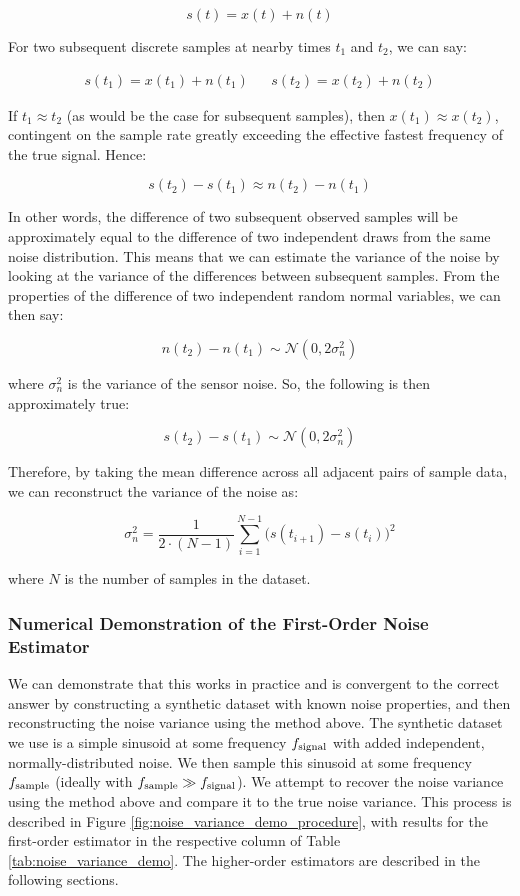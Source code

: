 \documentclass[conf]{new-aiaa}
\begin{document}
    $$s(t) = x(t) + n(t)$$

    \noindent For two subsequent discrete samples at nearby times $t_1$ and $t_2$, we can say:

    \begin{align*}
        s(t_1) = x(t_1) + n(t_1) &&
        s(t_2) = x(t_2) + n(t_2)
    \end{align*}

    \noindent If $t_1 \approx t_2$ (as would be the case for subsequent samples), then $x(t_1) \approx x(t_2)$, contingent on the sample rate greatly exceeding the effective fastest frequency of the true signal. Hence:

    $$s(t_2) - s(t_1) \approx n(t_2) - n(t_1)$$

    In other words, the difference of two subsequent observed samples will be approximately equal to the difference of two independent draws from the same noise distribution. This means that we can estimate the variance of the noise by looking at the variance of the differences between subsequent samples. From the properties of the difference of two independent random normal variables, we can then say:

    $$n(t_2) - n(t_1) \sim \mathcal{N}(0, 2\sigma^2_n)$$

    \noindent where $\sigma^2_n$ is the variance of the sensor noise. So, the following is then approximately true:

    $$s(t_2) - s(t_1) \sim \mathcal{N}(0, 2\sigma^2_n)$$

    Therefore, by taking the mean difference across all adjacent pairs of sample data, we can reconstruct the variance of the noise as:

    \begin{equation}
        \sigma^2_n = \frac{1}{2 \cdot (N-1)} \sum_{i=1}^{N-1} \Big( s(t_{i+1}) - s(t_i) \Big)^2
        \label{eq:1st_order_noise_estimator}
    \end{equation}

    \noindent where $N$ is the number of samples in the dataset.

    \subsubsection{Numerical Demonstration of the First-Order Noise Estimator}

    We can demonstrate that this works in practice and is convergent to the correct answer by constructing a synthetic dataset with known noise properties, and then reconstructing the noise variance using the method above. The synthetic dataset we use is a simple sinusoid at some frequency $f_{\rm signal}$ with added independent, normally-distributed noise. We then sample this sinusoid at some frequency $f_{\rm sample}$ (ideally with $f_{\rm sample} \gg f_{\rm signal}$). We attempt to recover the noise variance using the method above and compare it to the true noise variance. This process is described in Figure \ref{fig:noise_variance_demo_procedure}, with results for the first-order estimator in the respective column of Table \ref{tab:noise_variance_demo}. The higher-order estimators are described in the following sections.
\end{document}
